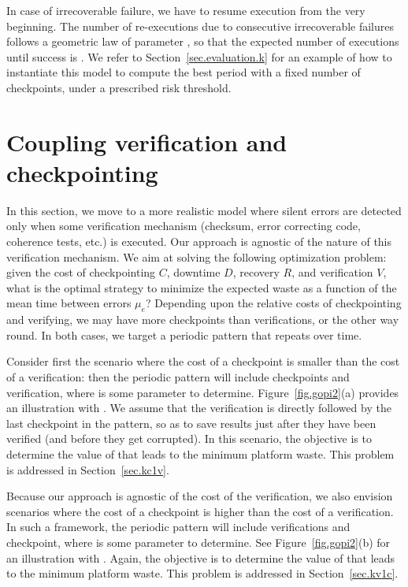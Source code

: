 \documentclass[10pt,table]{article}
\newcommand{\ema}[1]{\ensuremath{#1}\xspace}
\newcommand{\mue}{\ema{\mu_{e}}}
\newcommand{\ccc}{\ema{C}}
\newcommand{\rrr}{\ema{R}}
\newcommand{\ddd}{\ema{D}}
\newcommand{\vvv}{\ema{V}}
\begin{document}
In case of irrecoverable  failure, we have to resume execution from the very beginning. The number of re-executions
due to consecutive irrecoverable  failures follows a geometric law of parameter , so that the expected number of executions until success is .
We refer to Section~\ref{sec.evaluation.k} for an example of how to instantiate this model to
compute the best period with a fixed number of checkpoints, under a prescribed risk threshold.


\section{Coupling verification and checkpointing}
\label{sec.ourmodel}

In this section, we move to a more realistic model where silent errors are detected only when some verification mechanism (checksum, error correcting code, coherence tests, etc.) is executed. Our approach is agnostic of the nature of this verification mechanism. We aim at solving the following optimization problem:
given the cost of checkpointing \ccc, downtime \ddd, recovery \rrr, and verification \vvv, what is the optimal 
strategy to minimize the expected waste as a function of the mean time between errors \mue? Depending upon
the relative costs of checkpointing and verifying, we may have more checkpoints than verifications, 
or the other way round. In both cases, we target a periodic pattern that repeats over time. 

Consider first the scenario where the cost of a checkpoint is smaller than the cost of 
a verification: then the periodic pattern will include 
checkpoints and  verification, where  is some parameter to determine. 
Figure~\ref{fig.gopi2}(a) provides an illustration with . We assume that the 
verification is directly followed by the last checkpoint in the pattern, so as to save results 
just after they have been verified (and before they get corrupted). In this scenario,
the objective is to determine the value of  that leads to the minimum platform waste.
This problem is addressed in Section~\ref{sec.kc1v}.

Because our approach is agnostic of the cost of the verification, we also envision
scenarios where the cost of a checkpoint is higher than the cost of 
a verification. In such a framework, the periodic pattern will include  verifications
and  checkpoint, where  is some parameter to determine. 
See Figure~\ref{fig.gopi2}(b) for an illustration with . Again, the 
objective is to determine the value of  that leads to the minimum platform waste.
This problem is addressed in Section~\ref{sec.kv1c}.
\end{document}
